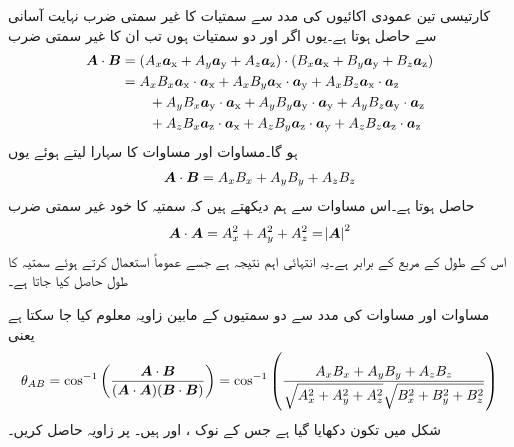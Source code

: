 کارتیسی تین عمودی اکائیوں کی مدد سے سمتیات کا غیر سمتی ضرب نہایت آسانی سے حاصل ہوتا ہے۔یوں اگر  اور    دو سمتیات ہوں تب ان کا غیر سمتی ضرب
\begin{align*}
\kvec{A} \cdot \kvec{B}&=(A_x\ax+A_y\ay+A_z\az) \cdot (B_x\ax+B_y\ay+B_z\az)\\
&=A_x B_x \ax \cdot \ax+A_x B_y \ax \cdot \ay+A_x B_z \ax \cdot \az\\
& \quad \quad +A_y B_x \ay \cdot \ax+A_y B_y \ay \cdot \ay+A_y B_z \ay \cdot \az \\
&\quad \quad +A_z B_x \az \cdot \ax+A_z B_y \az \cdot \ay+A_z B_z \az \cdot \az
\end{align*}
ہو گا۔مساوات  اور مساوات  کا سہارا لیتے ہوئے یوں
\begin{align}\label{مساوات_سمتیہ_نقطہ_ضرب_بمدد_اکائی_سمتیات}
\kvec{A} \cdot \kvec{B}=A_x B_x+A_y B_y+ A_z B_z
\end{align}
حاصل ہوتا ہے۔اس مساوات سے ہم دیکھتے ہیں کہ سمتیہ  کا خود غیر سمتی ضرب
\begin{align}
\kvec{A} \cdot \kvec{A} =A_x^2+A_y^2+ A_z^2=\abs{\kvec{A}}^2
\end{align}
اس کے طول کے مربع کے برابر ہے۔یہ انتہائی اہم نتیجہ ہے جسے عموماً استعمال کرتے ہوئے سمتیہ کا طول حاصل کیا جاتا ہے۔

مساوات  اور مساوات  کی مدد سے دو سمتیوں کے مابین زاویہ معلوم کیا جا سکتا ہے یعنی
\begin{align}
\theta_{AB}=\cos^{-1}\left(\frac{\kvec{A} \cdot \kvec{B}}{(\kvec{A} \cdot \kvec{A})(\kvec{B} \cdot \kvec{B})}\right)=\cos^{-1} \left(\frac{A_x B_x+A_y B_y+ A_z B_z}{\sqrt{A_x^2+A_y^2+A_z^2} \sqrt{B_x^2+B_y^2+B_z^2}} \right)
\end{align}
شکل  میں تکون دکھایا گیا ہے جس کے نوک  ،  اور   ہیں۔ پر زاویہ حاصل کریں۔


